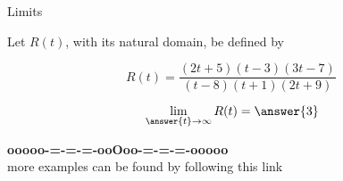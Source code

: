 \documentclass{ximera}
\begin{document}
\begin{example} Limits 



Let $R(t)$, with its natural domain, be defined by 



\[
  R(t) = \frac{(2t+5)(t-3)(3t-7)}{(t-8)(t+1)(2t+9)} \,
\]





\[   \lim_{\answer{t} \to \infty} R(t)   = \answer{3}     \]






\end{example}













\begin{center}
\textbf{\textcolor{green!50!black}{ooooo-=-=-=-ooOoo-=-=-=-ooooo}} \\

more examples can be found by following this link\\ 

\end{center}
\end{document}
